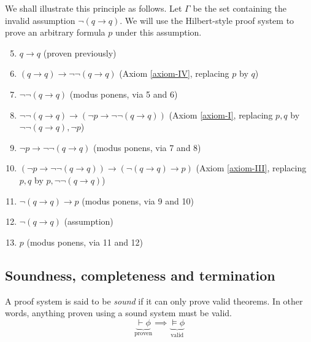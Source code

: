 We shall illustrate this principle as follows. Let \(\Gamma\) be the set containing the invalid assumption \(\neg(q \rightarrow q)\). We will use the Hilbert-style proof system to prove an arbitrary formula \(p\) under this assumption.
%
\begin{enumerate}
    \setcounter{enumi}{4}
    \item \(q \rightarrow q\)
    \hfill (proven previously)

    \item \((q \rightarrow q) \rightarrow \neg\neg(q \rightarrow q)\)
    \hfill (Axiom \ref{axiom-IV}, replacing \(p\) by \(q\))

    \item \(\neg\neg(q \rightarrow q)\)
    \hfill (modus ponens, via 5 and 6)

    \item \(\neg\neg(q \rightarrow q) \rightarrow (\neg p \rightarrow \neg\neg(q \rightarrow q))\)
    \hfill (Axiom \ref{axiom-I}, replacing \(p, q\) by \(\neg\neg(q \rightarrow q), \neg p\))

    \item \(\neg p \rightarrow \neg\neg(q \rightarrow q)\)
    \hfill (modus ponens, via 7 and 8)

    \item \((\neg p \rightarrow \neg\neg(q \rightarrow q)) \rightarrow (\neg (q \rightarrow q) \rightarrow p)\)
    \hfill (Axiom \ref{axiom-III}, replacing \(p, q\) by \(p, \neg\neg(q \rightarrow q)\))

    \item \(\neg (q \rightarrow q) \rightarrow p\)
    \hfill (modus ponens, via 9 and 10)

    \item \(\neg (q \rightarrow q)\)
    \hfill (assumption)

    \item \(p\)
    \hfill (modus ponens, via 11 and 12)
\end{enumerate}



\subsection{Soundness, completeness and termination}

A proof system is said to be \emph{sound} if it can only prove valid theorems. In other words, anything proven using a sound system must be valid.
%
\begin{equation}
    \underbrace{\vdash \phi}_{\text{proven}} \implies \underbrace{\models \phi}_{\text{valid}} \tag{soundness}
\end{equation}

